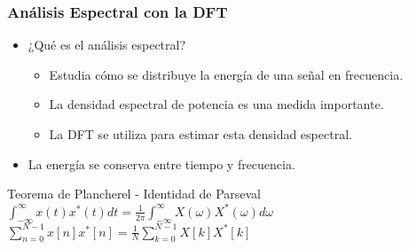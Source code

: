 \documentclass{beamer}
\numberwithin{section}{part}
\begin{document}
\begin{frame}
    \frametitle{Análisis Espectral con la DFT}
  \begin{itemize}
    \item ¿Qué es el análisis espectral?
    \begin{itemize}
        \item Estudia cómo se distribuye la energía de una señal en frecuencia.
        \item La densidad espectral de potencia es una medida importante.
        \item La DFT se utiliza para estimar esta densidad espectral.
    \end{itemize}    
    \item La energía se conserva entre tiempo y frecuencia.
  \end{itemize}    
  \begin{alertblock}{\centering Teorema de Plancherel - Identidad de Parseval}
    \vspace{0.2cm} \centering
    $\int_{-\infty}^{\infty}x(t)x^*(t)dt = \frac{1}{2\pi}\int_{-\infty}^{\infty}X(\omega)X^*(\omega)d\omega$ \\ \vspace{0.3cm}
    $\sum_{n=0}^{N-1}x[n] x^{*}[n] = \frac{1}{N}\sum_{k=0}^{N-1} X[k] X^*[k]$ \\ \vspace{0.3cm}
  \end{alertblock}  
\end{frame}    
\end{document}
